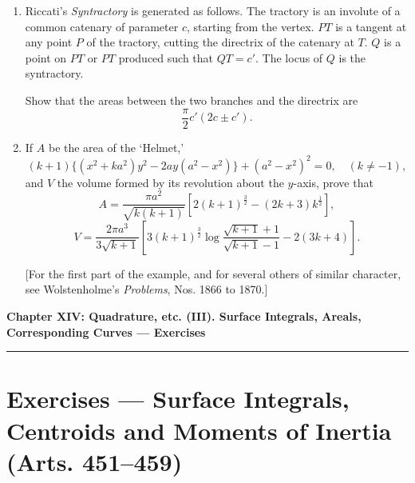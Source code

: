 \documentclass[11pt, a4paper]{article}
\begin{document}
\begin{enumerate}[leftmargin=2em]
\item Riccati's \textit{Syntractory} is generated as follows. The tractory is an involute of a common catenary of parameter $c$, starting from the vertex. $PT$ is a tangent at any point $P$ of the tractory, cutting the directrix of the catenary at $T$. $Q$ is a point on $PT$ or $PT$ produced such that $QT=c'$. The locus of $Q$ is the syntractory.

Show that the areas between the two branches and the directrix are
\[
\frac{\pi}{2}c'(2c\pm c').
\]

\item If $A$ be the area of the `Helmet,'
\[
(k+1)\{(x^2+ka^2)y^2-2ay(a^2-x^2)\}+(a^2-x^2)^2=0,\quad(k\neq-1),
\]
and $V$ the volume formed by its revolution about the $y$-axis, prove that
\[
A=\frac{\pi a^2}{\sqrt{k(k+1)}}\left[2(k+1)^{\frac32}-(2k+3)k^{\frac12}\right],
\]
\[
V=\frac{2\pi a^3}{3\sqrt{k+1}}\left[3(k+1)^{\frac32}\log\frac{\sqrt{k+1}+1}{\sqrt{k+1}-1}-2(3k+4)\right].
\]

[For the first part of the example, and for several others of similar character, see Wolstenholme's \textit{Problems}, Nos. 1866 to 1870.]

\end{enumerate}

\newpage

\begin{center}
    {\LARGE \bfseries \color{accent} Chapter XIV: Quadrature, etc. (III). Surface Integrals, Areals, Corresponding Curves --- Exercises}\\
    \vspace{0.2cm}
    {\color{accent}\rule{0.55\linewidth}{0.8pt}}
\end{center}
\vspace{0.35cm}

\section*{Exercises --- Surface Integrals, Centroids and Moments of Inertia (Arts. 451--459)}
\end{document}
